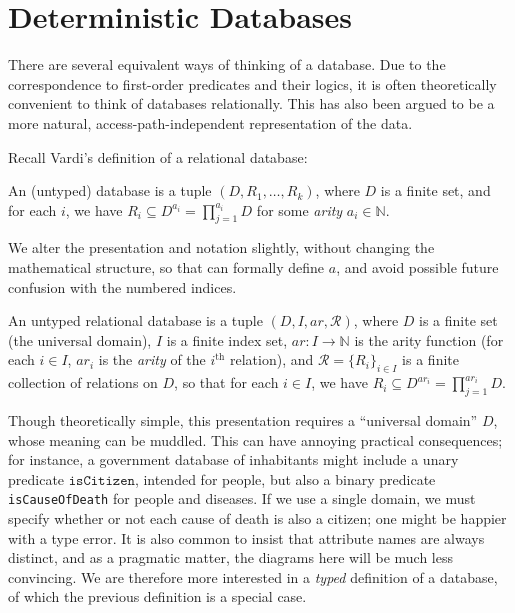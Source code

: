 \documentclass{article}
\theoremstyle{definition}
\theoremstyle{remark}
\newcommand{\arity}{\mathit{ar}}
\begin{document}

\section{Deterministic Databases}

There are several equivalent ways of thinking of a database. Due to the correspondence to first-order predicates and their logics, it is often theoretically convenient to think of databases relationally. This has also been argued \cite{Codd} to be a more natural, access-path-independent representation of the data.   

Recall Vardi's \cite{vardi} definition of a relational database:
\begin{leftbar}	
\begin{defn*}
    An (untyped) database is a tuple $(D, R_1, \ldots, R_k)$, where $D$ is a finite set, and for each $i$, we have $R_i \subseteq D^{a_i} = \prod_{j =1}^{a_i} D$ 
    for some \emph{arity} $a_i \in \mathbb N$. 
\end{defn*}
\end{leftbar}

We alter the presentation and notation slightly, without changing the mathematical structure, so that can formally define $a$, and avoid possible future confusion with the numbered indices. 

\begin{defn}
    An untyped relational database is a tuple $(D, I, \arity, \mathcal R)$, where $D$ is a
    finite set (the universal domain), $I$ is a finite index set, $\arity: I \to
    \mathbb N$ is the arity function (for each $i \in I$, $\arity_i$ is the
    \emph{arity} of the $i^{\text{th}}$ relation), and $\mathcal R = \{R_i\}_{i
    \in I}$ is a finite collection of relations on $D$, so that for each $i \in
    I$, we have $R_i \subseteq D^{\arity_i} = \prod_{j =1}^{\arity_i} D$.
\end{defn}

Though theoretically simple, this presentation requires a  ``universal domain'' $D$, whose meaning can be muddled. This can have annoying practical consequences; for instance, a government database of inhabitants might include a unary predicate $\texttt{isCitizen}$, intended for people, but also a binary predicate \texttt{isCauseOfDeath} for people and diseases. If we use a single domain, we must specify whether or not each cause of death is also a citizen; one might be happier with a type error.
It is also common to insist that attribute names are always distinct, and as a pragmatic matter, the diagrams here will be much less convincing. 
%
We are therefore more interested in a \emph{typed} definition of a database, of which the previous definition is a special case.
\end{document}
